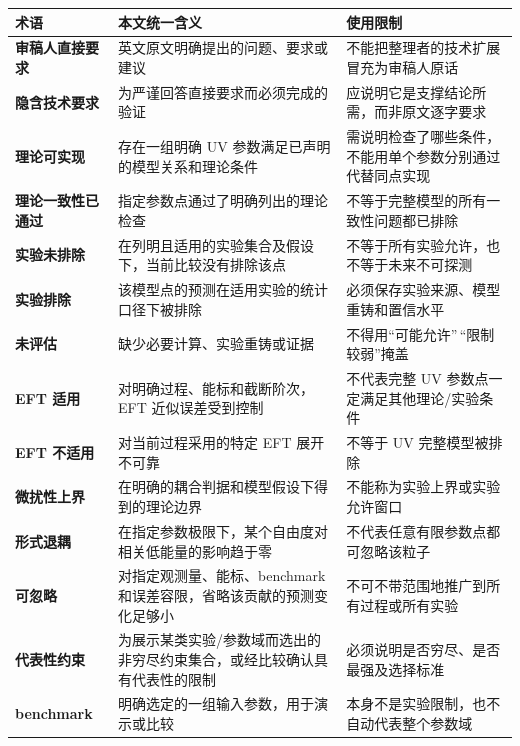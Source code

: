 \documentclass[
  chinese,
  UTF8]{ctexart}
\newcounter{none} %
\begin{document}
{\def\LTcaptype{none} %
\begin{longtable}[]{@{}
  >{\raggedright\arraybackslash}p{}
  >{\raggedright\arraybackslash}p{}
  >{\raggedright\arraybackslash}p{}@{}}
\toprule\noalign{}
\begin{minipage}[b]{\linewidth}\raggedright
术语
\end{minipage} & \begin{minipage}[b]{\linewidth}\raggedright
本文统一含义
\end{minipage} & \begin{minipage}[b]{\linewidth}\raggedright
使用限制
\end{minipage} \\
\midrule\noalign{}
\endhead
\bottomrule\noalign{}
\endlastfoot
\textbf{审稿人直接要求} & 英文原文明确提出的问题、要求或建议 &
不能把整理者的技术扩展冒充为审稿人原话 \\
\textbf{隐含技术要求} & 为严谨回答直接要求而必须完成的验证 &
应说明它是支撑结论所需，而非原文逐字要求 \\
\textbf{理论可实现} & 存在一组明确 UV 参数满足已声明的模型关系和理论条件
& 需说明检查了哪些条件，不能用单个参数分别通过代替同点实现 \\
\textbf{理论一致性已通过} & 指定参数点通过了明确列出的理论检查 &
不等于完整模型的所有一致性问题都已排除 \\
\textbf{实验未排除} &
在列明且适用的实验集合及假设下，当前比较没有排除该点 &
不等于所有实验允许，也不等于未来不可探测 \\
\textbf{实验排除} & 该模型点的预测在适用实验的统计口径下被排除 &
必须保存实验来源、模型重铸和置信水平 \\
\textbf{未评估} & 缺少必要计算、实验重铸或证据 &
不得用``可能允许''\,``限制较弱''掩盖 \\
\textbf{EFT 适用} & 对明确过程、能标和截断阶次，EFT 近似误差受到控制 &
不代表完整 UV 参数点一定满足其他理论/实验条件 \\
\textbf{EFT 不适用} & 对当前过程采用的特定 EFT 展开不可靠 & 不等于 UV
完整模型被排除 \\
\textbf{微扰性上界} & 在明确的耦合判据和模型假设下得到的理论边界 &
不能称为实验上界或实验允许窗口 \\
\textbf{形式退耦} & 在指定参数极限下，某个自由度对相关低能量的影响趋于零
& 不代表任意有限参数点都可忽略该粒子 \\
\textbf{可忽略} & 对指定观测量、能标、benchmark
和误差容限，省略该贡献的预测变化足够小 &
不可不带范围地推广到所有过程或所有实验 \\
\textbf{代表性约束} &
为展示某类实验/参数域而选出的非穷尽约束集合，或经比较确认具有代表性的限制
& 必须说明是否穷尽、是否最强及选择标准 \\
\textbf{benchmark} & 明确选定的一组输入参数，用于演示或比较 &
本身不是实验限制，也不自动代表整个参数域 \\
\end{longtable}
}
\end{document}
